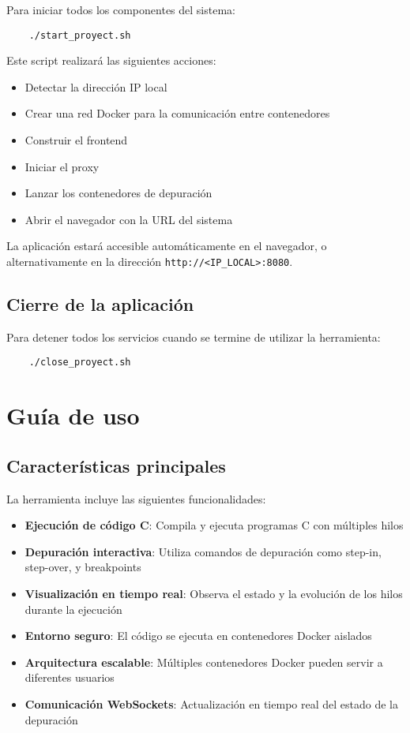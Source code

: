 Para iniciar todos los componentes del sistema:

    \begin{verbatim}
    ./start_proyect.sh
    \end{verbatim}

Este script realizará las siguientes acciones:
\begin{itemize}
    \item Detectar la dirección IP local
    \item Crear una red Docker para la comunicación entre contenedores
    \item Construir el frontend
    \item Iniciar el proxy
    \item Lanzar los contenedores de depuración
    \item Abrir el navegador con la URL del sistema
\end{itemize}

La aplicación estará accesible automáticamente en el navegador, o alternativamente en la dirección \texttt{http://<IP\_LOCAL>:8080}.

\subsection{Cierre de la aplicación}

Para detener todos los servicios cuando se termine de utilizar la herramienta:

\begin{verbatim}
    ./close_proyect.sh
\end{verbatim}

\section{Guía de uso}

\subsection{Características principales}

La herramienta incluye las siguientes funcionalidades:

\begin{itemize}
    \item \textbf{Ejecución de código C}: Compila y ejecuta programas C con múltiples hilos
    \item \textbf{Depuración interactiva}: Utiliza comandos de depuración como step-in, step-over, y breakpoints
    \item \textbf{Visualización en tiempo real}: Observa el estado y la evolución de los hilos durante la ejecución
    \item \textbf{Entorno seguro}: El código se ejecuta en contenedores Docker aislados
    \item \textbf{Arquitectura escalable}: Múltiples contenedores Docker pueden servir a diferentes usuarios
    \item \textbf{Comunicación WebSockets}: Actualización en tiempo real del estado de la depuración
\end{itemize}

